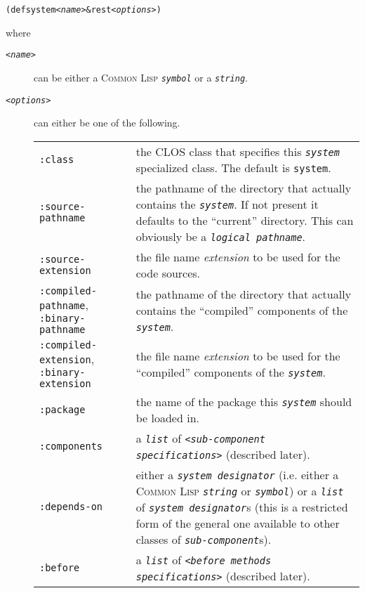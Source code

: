 \documentclass[a4paper]{article}
\newcommand{\CL}{\textsc{Common Lisp}}
\newcommand{\CLOS}{\textsc{CLOS}}
\newcommand{\code}[1]{\texttt{#1}}
\newcommand{\object}[1]{\texttt{\textit{#1}}} %
\newcommand{\clobject}[1]{\texttt{\textit{#1}}} %
\newcommand{\syntaxnt}[1]{\emph{<#1>}}
\begin{document}
\begin{alltt}
  (defsystem \syntaxnt{name} &rest \syntaxnt{options})
\end{alltt}
where
\begin{description}
\item[{\code{\syntaxnt{name}}}] can be either a \CL{} \clobject{symbol} or
	a \clobject{string}.
\item[{\code{\syntaxnt{options}}}] can either be one of the following.\\
	\begin{tabular}{p{}p{}}
	\code{:class}
		& the \CLOS{} class that specifies this
		  \object{system} specialized class.
		  The default is \code{system}.\\[1mm]

	\code{:source-pathname}
		& the pathname of the directory that actually contains
		  the \object{system}. If not present it defaults to
		  the ``current'' directory.
		  This can obviously be a \clobject{logical
		  pathname}.\\[1mm]

	\code{:source-extension}
		& the file name \emph{extension} to be used for the
		code sources.\\[1mm]


	\code{:compiled-pathname}, \code{:binary-pathname}
		& the pathname of the directory that actually contains
		the ``compiled'' components of the \object{system}.\\[1mm]

	\code{:compiled-extension}, \code{:binary-extension}
		& the file name \emph{extension} to be used for the
		``compiled'' components of the \object{system}.\\[1mm]


	\code{:package}
		& the name of the package this \object{system} should
		be loaded in.\\[1mm]

	\code{:components}
		& a \clobject{list} of \code{\syntaxnt{sub-component
		  specifications}} (described later).\\[1mm]

	\code{:depends-on}
		& either a \object{system designator} (i.e. either a
		\CL{} \clobject{string} or \clobject{symbol}) or a
		\clobject{list} of \object{system designator}s (this
		is a restricted form of the general one available to
		other classes of \object{sub-component}s).\\[1mm]

	\code{:before}
		& a \clobject{list} of \code{\syntaxnt{before methods
		  specifications}} (described later).\\[1mm]


\end{tabular}
\end{description}
\end{document}
